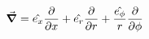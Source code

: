 \begin{equation}
  \grad =  
      \hat{e_x}\pdv{x} 
    + \hat{e_r}\pdv{r} 
    + \frac{\hat{e_\phi}}{r}\pdv{\phi}
\end{equation}

